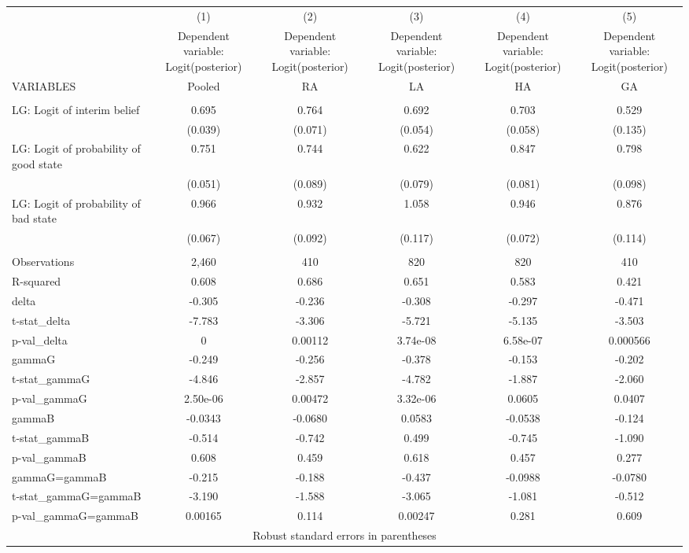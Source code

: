 \documentclass[]{article}
\begin{document}
\begin{tabular}{lccccc} \hline
 & (1) & (2) & (3) & (4) & (5) \\
 & Dependent variable: Logit(posterior) & Dependent variable: Logit(posterior) & Dependent variable: Logit(posterior) & Dependent variable: Logit(posterior) & Dependent variable: Logit(posterior) \\
VARIABLES & Pooled & RA & LA & HA & GA \\ \hline
 &  &  &  &  &  \\
LG: Logit of interim belief & 0.695 & 0.764 & 0.692 & 0.703 & 0.529 \\
 & (0.039) & (0.071) & (0.054) & (0.058) & (0.135) \\
LG: Logit of probability of good state & 0.751 & 0.744 & 0.622 & 0.847 & 0.798 \\
 & (0.051) & (0.089) & (0.079) & (0.081) & (0.098) \\
LG: Logit of probability of bad state & 0.966 & 0.932 & 1.058 & 0.946 & 0.876 \\
 & (0.067) & (0.092) & (0.117) & (0.072) & (0.114) \\
 &  &  &  &  &  \\
Observations & 2,460 & 410 & 820 & 820 & 410 \\
R-squared & 0.608 & 0.686 & 0.651 & 0.583 & 0.421 \\
delta & -0.305 & -0.236 & -0.308 & -0.297 & -0.471 \\
t-stat\_delta & -7.783 & -3.306 & -5.721 & -5.135 & -3.503 \\
p-val\_delta & 0 & 0.00112 & 3.74e-08 & 6.58e-07 & 0.000566 \\
gammaG & -0.249 & -0.256 & -0.378 & -0.153 & -0.202 \\
t-stat\_gammaG & -4.846 & -2.857 & -4.782 & -1.887 & -2.060 \\
p-val\_gammaG & 2.50e-06 & 0.00472 & 3.32e-06 & 0.0605 & 0.0407 \\
gammaB & -0.0343 & -0.0680 & 0.0583 & -0.0538 & -0.124 \\
t-stat\_gammaB & -0.514 & -0.742 & 0.499 & -0.745 & -1.090 \\
p-val\_gammaB & 0.608 & 0.459 & 0.618 & 0.457 & 0.277 \\
gammaG=gammaB & -0.215 & -0.188 & -0.437 & -0.0988 & -0.0780 \\
t-stat\_gammaG=gammaB & -3.190 & -1.588 & -3.065 & -1.081 & -0.512 \\
 p-val\_gammaG=gammaB & 0.00165 & 0.114 & 0.00247 & 0.281 & 0.609 \\ \hline
\multicolumn{6}{c}{ Robust standard errors in parentheses} \\
\end{tabular}
\end{document}
